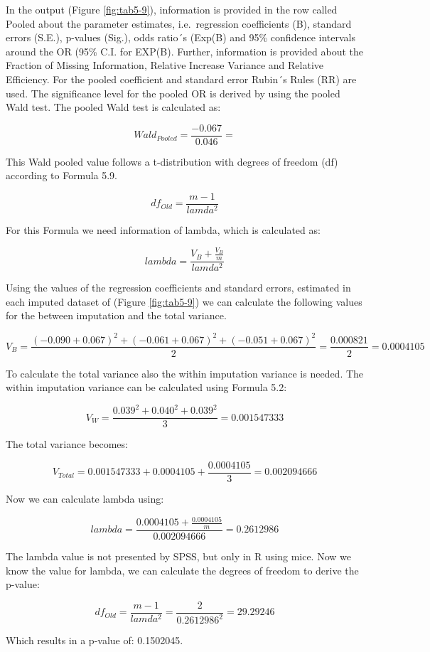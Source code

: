 \documentclass[]{book}
\theoremstyle{definition}
\theoremstyle{definition}
\theoremstyle{definition}
\theoremstyle{remark}
\begin{document}
In the output (Figure \ref{fig:tab5-9}), information is provided in the
row called Pooled about the parameter estimates, i.e.~regression
coefficients (B), standard errors (S.E.), p-values (Sig.), odds ratio´s
(Exp(B) and 95\% confidence intervals around the OR (95\% C.I. for
EXP(B). Further, information is provided about the Fraction of Missing
Information, Relative Increase Variance and Relative Efficiency. For the
pooled coefficient and standard error Rubin´s Rules (RR) are used. The
significance level for the pooled OR is derived by using the pooled Wald
test. The pooled Wald test is calculated as:

\[Wald_{Pooled} =\frac{-0.067}{0.046}=\]

This Wald pooled value follows a t-distribution with degrees of freedom
(df) according to Formula 5.9.

\[df_{Old} = \frac{m-1}{lamda^2}\]

For this Formula we need information of lambda, which is calculated as:

\[lambda = \frac{V_B + \frac{V_B}{m}}{lamda^2}\]

Using the values of the regression coefficients and standard errors,
estimated in each imputed dataset of (Figure \ref{fig:tab5-9}) we can
calculate the following values for the between imputation and the total
variance.

\[V_B= \frac{(-0.090+0.067)^2 + (-0.061+0.067)^2 +(-0.051+0.067)^2}{2}=\frac{0.000821}{2}=0.0004105\]

To calculate the total variance also the within imputation variance is
needed. The within imputation variance can be calculated using Formula
5.2:

\[V_W= \frac{0.039^2 + 0.040^2 + 0.039^2}{3}=0.001547333\]

The total variance becomes:

\[V_{Total} = 0.001547333+0.0004105+ \frac{0.0004105}{3}=0.002094666\]

Now we can calculate lambda using:

\[lambda = \frac{0.0004105 + \frac{0.0004105}{m}}{0.002094666}=0.2612986\]

The lambda value is not presented by SPSS, but only in R using mice. Now
we know the value for lambda, we can calculate the degrees of freedom to
derive the p-value:

\[df_{Old} = \frac{m-1}{lamda^2}=\frac{2}{0.2612986^2}=29.29246\]

Which results in a p-value of: 0.1502045.
\end{document}

